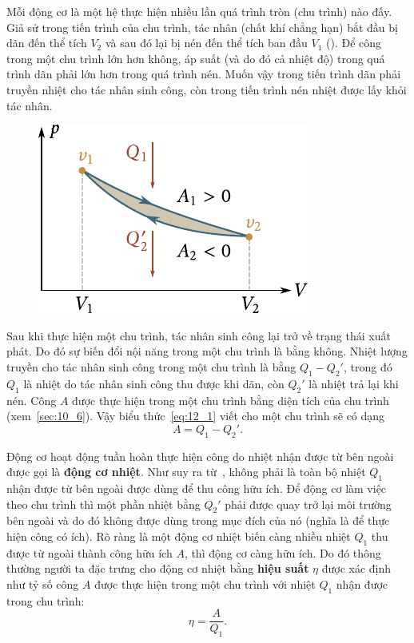 Mỗi động cơ là một hệ thực hiện nhiều lần quá trình tròn (chu trình) nào đấy. Giả sử trong tiến trình của chu trình, tác nhân (chất khí chẳng hạn) bắt đầu bị dãn đến thể tích $V_2$ và sau đó lại bị nén đến thể tích ban đầu $V_1$ (). Để công trong một chu trình lớn hơn không, áp suất (và do đó cả nhiệt độ) trong quá trình dãn phải lớn hơn trong quá trình nén. Muốn vậy trong tiến trình dãn phải truyền nhiệt cho tác nhân sinh công, còn trong tiến trình nén nhiệt được lấy khỏi tác nhân.

\begin{figure}[!htb]
	\begin{center}
		\includegraphics[scale=1.0]{figures/ch_12/fig_12_1.pdf}
		\caption[]{}
		\label{fig:12_1}
	\end{center}
\end{figure}

Sau khi thực hiện một chu trình, tác nhân sinh công lại trở về trạng thái xuất phát. Do đó sự biến đổi nội năng trong một chu trình là bằng không. Nhiệt lượng truyền cho tác nhân sinh công trong một chu trình là bằng $Q_1-Q_2'$, trong đó $Q_1$ là nhiệt do tác nhân sinh công thu được khi dãn, còn $Q_2'$ là nhiệt trả lại khi nén. Công $A$ được thực hiện trong một chu trình bằng diện tích của chu trình (xem~\ref{sec:10_6}). Vậy biểu thức~\eqref{eq:12_1} viết cho một chu trình sẽ có dạng
\begin{equation}\label{eq:12_3}
	A = Q_1 - Q_2'.
\end{equation}

Động cơ hoạt động tuần hoàn thực hiện công do nhiệt nhận được từ bên ngoài được gọi là \textbf{động cơ nhiệt}. Như suy ra từ~, không phải là toàn bộ nhiệt $Q_1$ nhận được từ bên ngoài được dùng để thu công hữu ích. Để động cơ làm việc theo chu trình thì một phần nhiệt bằng $Q_2'$ phải được quay trở lại môi trường bên ngoài và do đó không được dùng trong mục đích của nó (nghĩa là để thực hiện công có ích). Rõ ràng là một động cơ nhiệt biến càng nhiều nhiệt $Q_1$ thu được từ ngoài thành công hữu ích $A$, thì động cơ càng hữu ích. Do đó thông thường người ta đặc trưng cho động cơ nhiệt bằng \textbf{hiệu suất} $\eta$ được xác định như tỷ số công $A$ được thực hiện trong một chu trình với nhiệt $Q_1$ nhận được trong chu trình:
\begin{equation}\label{eq:12_4}
	\eta = \frac{A}{Q_1}.
\end{equation}

